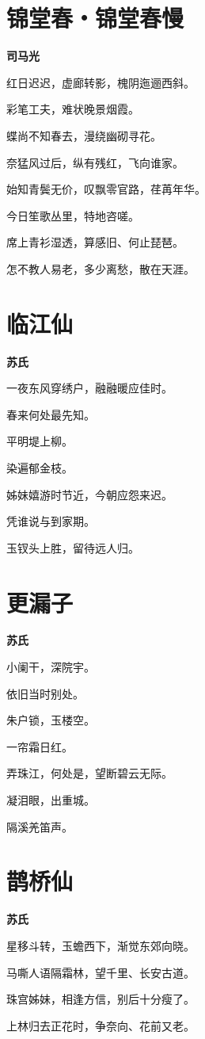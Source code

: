 \documentclass[12pt,a4paper]{ctexbook}
\begin{document}
\section{锦堂春・锦堂春慢}
\textbf{司马光}\par\vspace{0.5em}
红日迟迟，虚廊转影，槐阴迤逦西斜。\par
彩笔工夫，难状晚景烟霞。\par
蝶尚不知春去，漫绕幽砌寻花。\par
奈猛风过后，纵有残红，飞向谁家。\par
始知青鬓无价，叹飘零官路，荏苒年华。\par
今日笙歌丛里，特地咨嗟。\par
席上青衫湿透，算感旧、何止琵琶。\par
怎不教人易老，多少离愁，散在天涯。\par

\section{临江仙}
\textbf{苏氏}\par\vspace{0.5em}
一夜东风穿绣户，融融暖应佳时。\par
春来何处最先知。\par
平明堤上柳。\par
染遍郁金枝。\par
姊妹嬉游时节近，今朝应怨来迟。\par
凭谁说与到家期。\par
玉钗头上胜，留待远人归。\par

\section{更漏子}
\textbf{苏氏}\par\vspace{0.5em}
小阑干，深院宇。\par
依旧当时别处。\par
朱户锁，玉楼空。\par
一帘霜日红。\par
弄珠江，何处是，望断碧云无际。\par
凝泪眼，出重城。\par
隔溪羌笛声。\par

\section{鹊桥仙}
\textbf{苏氏}\par\vspace{0.5em}
星移斗转，玉蟾西下，渐觉东郊向晓。\par
马嘶人语隔霜林，望千里、长安古道。\par
珠宫姊妹，相逢方信，别后十分瘦了。\par
上林归去正花时，争奈向、花前又老。\par
\end{document}
